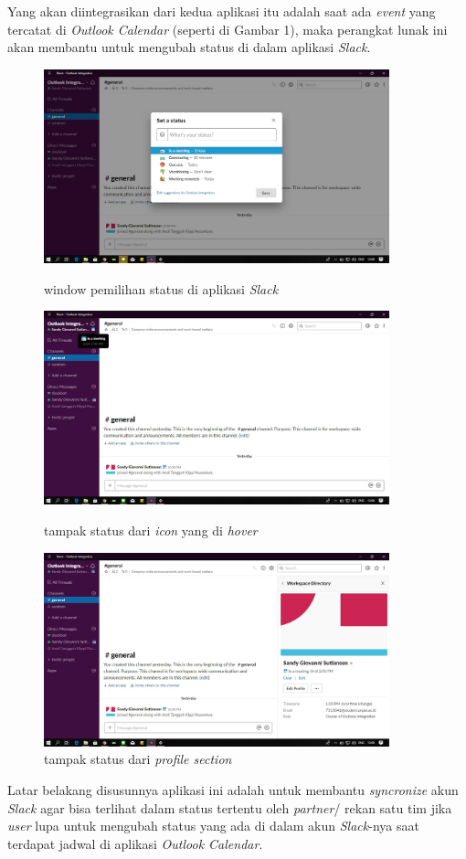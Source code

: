 \documentclass[a4paper,twoside]{article}
\begin{document}
Yang akan diintegrasikan dari kedua aplikasi itu adalah saat ada \textit{event} yang tercatat di \textit{Outlook Calendar} (seperti di Gambar 1), maka perangkat lunak ini akan membantu untuk mengubah status di dalam aplikasi \textit{Slack}.
\clearpage
\begin{figure}[h!]
\begin{center}
  \includegraphics[width=10cm]{img/slack_1.jpg}
  \caption{window pemilihan status di aplikasi \textit{Slack}}
  \includegraphics[width=10cm]{img/slack_2.jpg}
  \caption{tampak status dari \textit{icon} yang di \textit{hover}}
  \includegraphics[width=10cm]{img/slack_3.jpg}
  \caption{tampak status dari \textit{profile section}}
\end{center}
\end{figure}

Latar belakang disusunnya aplikasi ini adalah untuk membantu \textit{syncronize} akun \textit{Slack} agar bisa terlihat dalam status tertentu oleh \textit{partner}/ rekan satu tim jika \textit{user} lupa untuk mengubah status yang ada di dalam akun \textit{Slack}-nya saat terdapat jadwal di aplikasi \textit{Outlook Calendar}. 
\end{document}
